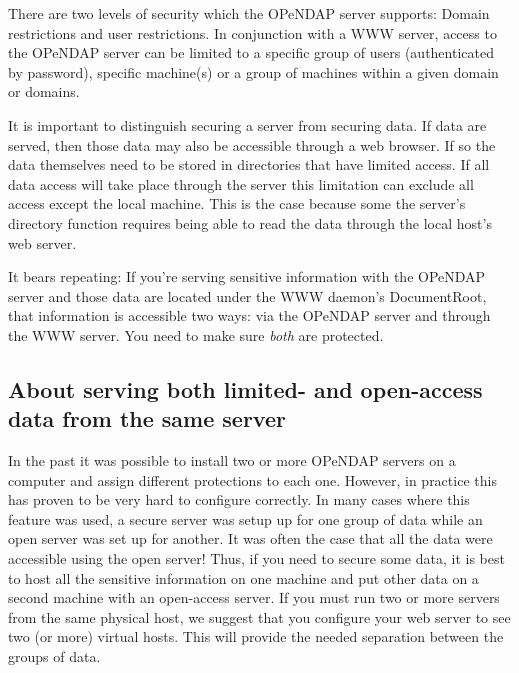 \documentclass{dods-book}
\begin{document}
There are two levels of security which the OPeNDAP server supports:
Domain restrictions and user restrictions. In conjunction with a WWW
server, access to the OPeNDAP server can be limited to a specific
group of users (authenticated by password), specific machine(s) or a
group of machines within a given domain or domains.


It is important to distinguish securing a server from securing data.
If data are served, then those data may also be accessible through a
web browser. If so the data themselves need to be stored in
directories that have limited access. If all data access will take
place through the server this limitation can exclude all access except
the local machine. This is the case because some the server's
directory function requires being able to read the data through the
local host's web server.

It bears repeating: If you're serving sensitive information with the OPeNDAP
server and those data are located under the WWW daemon's DocumentRoot, that
information is accessible two ways: via the OPeNDAP server and through the
WWW server. You need to make sure \emph{both} are protected.


\subsection{About serving both limited- and open-access data from the same server}

In the past it was possible to install two or more OPeNDAP servers on a
computer and assign different protections to each one. However, in practice
this has proven to be very hard to configure correctly. In many cases
where this feature was used, a secure server was setup up for one group of
data while an open server was set up for another. It was often the case that
all the data were accessible using the open server! Thus, if you need to
secure some data, it is best to host all the sensitive information on one
machine and put other data on a second machine with an open-access server. If
you must run two or more servers from the same physical host, we suggest
that you configure your web server to see two (or more) virtual hosts. This
will provide the needed separation between the groups of data.
\end{document}
